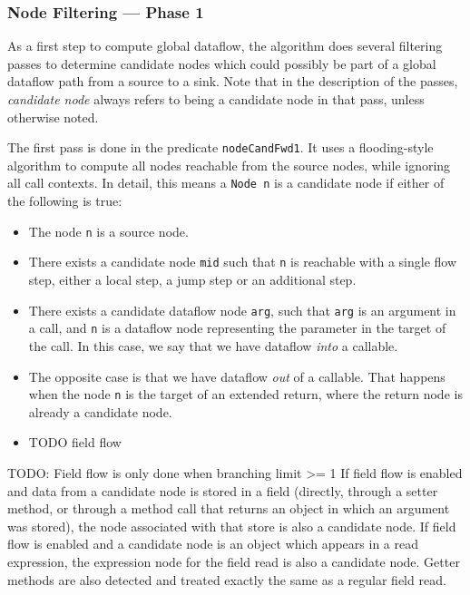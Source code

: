 \subsubsection*{Node Filtering --- Phase 1}
As a first step to compute global dataflow, the algorithm does several filtering passes to 
determine candidate nodes which could possibly be part of a global dataflow path from
a source to a sink.
Note that in the description of the passes, \emph{candidate node} always refers
to being a candidate node in that pass, unless otherwise noted.

The first pass is done in the predicate \texttt{nodeCandFwd1}.
It uses a flooding-style algorithm to compute all nodes reachable from the source nodes,
while ignoring all call contexts.
In detail, this means a \texttt{Node n} is a candidate node if either of the following is true:
\begin{itemize}
    \item The node \texttt{n} is a source node.
    \item There exists a candidate node \texttt{mid} such that \texttt{n} is reachable with a single flow step,
    either a local step, a jump step or an additional step.
    \item There exists a candidate dataflow node \texttt{arg}, such that \texttt{arg} is an argument in 
    a call, and \texttt{n} is a dataflow node representing the parameter in the target of the call.
    In this case, we say that we have dataflow \emph{into} a callable.
    \item The opposite case is that we have dataflow \emph{out} of a callable.
    That happens when the node \texttt{n} is the target of an extended return, 
    where the return node is already a candidate node.
    \item TODO field flow
\end{itemize}
TODO: Field flow is only done when branching limit >= 1
If field flow is enabled and data from a candidate node is stored in a field
(directly, through a setter method, or through a method call that returns an
 object in which an argument was stored), the node associated with that store
 is also a candidate node.
 If field flow is enabled and a candidate node is an object which appears in a 
 read expression, the expression node for the field read is also a candidate node.
Getter methods are also detected and treated exactly the same as a regular field read.


